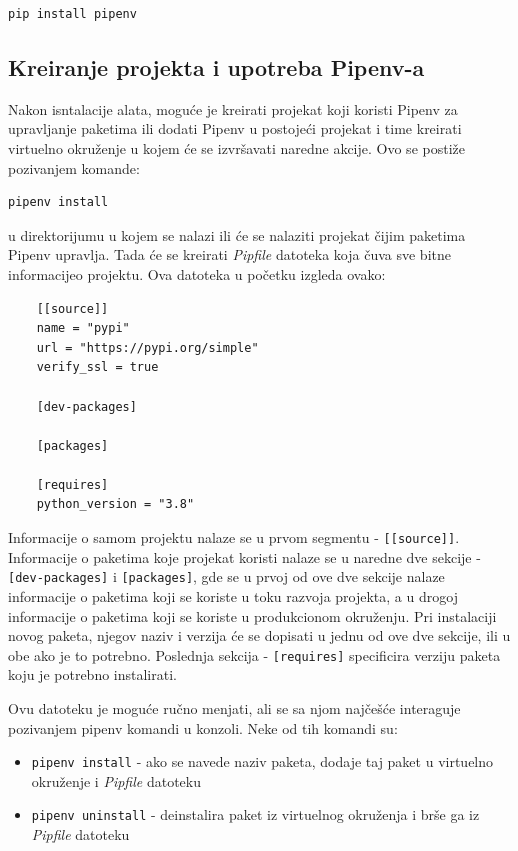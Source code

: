 \documentclass[12pt]{report}
\begin{document}
\begin{verbatim}
pip install pipenv
\end{verbatim}

\subsection{Kreiranje projekta i upotreba Pipenv-a}

Nakon isntalacije alata, moguće je kreirati projekat koji koristi Pipenv za upravljanje paketima ili dodati Pipenv u postojeći projekat i time kreirati virtuelno okruženje u kojem će se izvršavati naredne akcije. Ovo se postiže pozivanjem komande:

\begin{verbatim}
pipenv install
\end{verbatim}

u direktorijumu u kojem se nalazi ili će se nalaziti projekat čijim paketima Pipenv upravlja. Tada će se kreirati \textit{Pipfile} datoteka koja čuva sve bitne informacijeo projektu. Ova datoteka u početku izgleda ovako:

\begin{samepage}
    \begin{verbatim}
    [[source]]
    name = "pypi"
    url = "https://pypi.org/simple"
    verify_ssl = true

    [dev-packages]

    [packages]

    [requires]
    python_version = "3.8"
    \end{verbatim}
\end{samepage}

Informacije o samom projektu nalaze se u prvom segmentu - \texttt{[[source]]}. Informacije o paketima koje projekat koristi nalaze se u naredne dve sekcije - \texttt{[dev-packages]} i \texttt{[packages]}, gde se u prvoj od ove dve sekcije nalaze informacije o paketima koji se koriste u toku razvoja projekta, a u drogoj informacije o paketima koji se koriste u produkcionom okruženju. Pri instalaciji novog paketa, njegov naziv i verzija će se dopisati u jednu od ove dve sekcije, ili u obe ako je to potrebno. Poslednja sekcija - \texttt{[requires]} specificira verziju paketa koju je potrebno instalirati.

Ovu datoteku je moguće ručno menjati, ali se sa njom najčešće interaguje pozivanjem pipenv komandi u konzoli. Neke od tih komandi su:

\begin{itemize}
    \item \texttt{pipenv install} - ako se navede naziv paketa, dodaje taj paket u virtuelno okruženje i \textit{Pipfile} datoteku
    \item \texttt{pipenv uninstall} - deinstalira paket iz virtuelnog okruženja i brše ga iz \textit{Pipfile} datoteku
\end{itemize}
\end{document}
